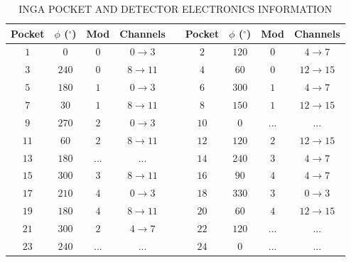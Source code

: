 \clearpage

\begin{table}
\caption{INGA POCKET AND DETECTOR ELECTRONICS INFORMATION\label{tbl:app2-inga-detectors}}
\begin{center}
\begin{tabular}{ccccccccc}
\toprule
Pocket & $\phi$ ($^{\circ}$) & Mod & Channels & & Pocket & $\phi$ ($^{\circ}$) & Mod & Channels\\
\midrule{}
$1$&  $0$&$0$& $0\rightarrow{}3$ &  & $2$&$120$&$0$& $4\rightarrow{}7$\\
$3$&$240$&$0$& $8\rightarrow{}11$&  & $4$& $60$&$0$&$12\rightarrow{}15$\\

$5$&$180$&$1$& $0\rightarrow{}3$ &  & $6$&$300$&$1$& $4\rightarrow{}7$\\
$7$& $30$&$1$& $8\rightarrow{}11$&  & $8$&$150$&$1$&$12\rightarrow{}15$\\

$9$&$270$&$2$& $0\rightarrow{}3$ &  &$10$&  $0$&...&...\\
$11$& $60$&$2$& $8\rightarrow{}11$&  &$12$&$120$&$2$&$12\rightarrow{}15$\\

$13$&$180$&...&        ...        &  &$14$&$240$&$3$& $4\rightarrow{}7$\\
$15$&$300$&$3$& $8\rightarrow{}11$&  &$16$& $90$&$4$& $4\rightarrow{}7$\\
$17$&$210$&$4$& $0\rightarrow{}3$ &  &$18$&$330$&$3$& $0\rightarrow{}3$\\
$19$&$180$&$4$& $8\rightarrow{}11$&  &$20$& $60$&$4$&$12\rightarrow{}15$\\
$21$&$300$&$2$& $4\rightarrow{}7$ &  &$22$&$120$&...&...\\
$23$&$240$&...&        ...        &  &$24$&  $0$&...&...\\
\bottomrule
\end{tabular}
\end{center}
\end{table}

\clearpage

